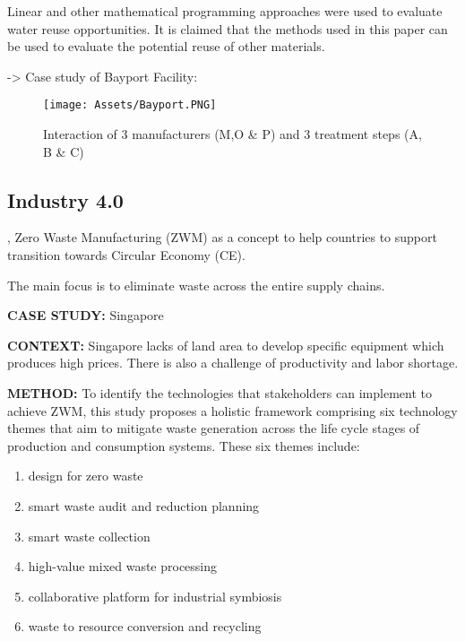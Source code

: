 \textbf{}\par
\textcite{Keckler1998} Linear and other mathematical programming approaches were used to evaluate water reuse opportunities. It is claimed that the methods used in this paper can be used to evaluate the potential reuse of other materials. \par
-> Case study of Bayport Facility:

\begin{figure}[h!]
    \centering
    \texttt{[image: Assets/Bayport.PNG]}
    \caption{Interaction of 3 manufacturers (M,O \& P) and 3 treatment steps (A, B \& C)}
    \label{fig:Bayport}
\end{figure}


\subsection{Industry 4.0}
\textbf{}\par
\textcite{Kerdlap2019}, Zero Waste Manufacturing (ZWM) as a concept to help countries to support transition towards Circular Economy (CE). \par
The main focus is to eliminate waste across the entire supply chains.\par


\textbf{CASE STUDY:} Singapore\par
\textbf{CONTEXT:} Singapore lacks of land area to develop specific equipment which produces high prices. There is also a challenge of productivity and labor shortage.\par
\textbf{METHOD:} To identify the technologies that stakeholders can implement to achieve ZWM, this study proposes a holistic framework comprising six technology themes that aim to mitigate waste generation across the life cycle stages of production and consumption systems. These six themes include:\par

\begin{enumerate}
    \item design for zero waste
    \item smart waste audit and reduction planning
    \item smart waste collection
    \item high-value mixed waste processing
    \item collaborative platform for industrial symbiosis
    \item waste to resource conversion and recycling
\end{enumerate}\par

